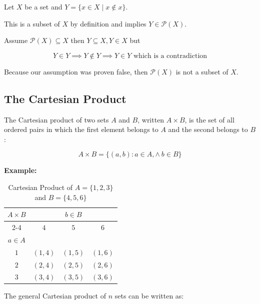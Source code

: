 Let \(X\) be a set and \(Y = \{x \in X \mid x \notin x\}\). 

This is a subset of \(X\) by definition and implies \(Y \in \mathcal{P}(X)\). 

Assume \(\mathcal{P}(X) \subseteq X\) then \(Y \subseteq X, Y \in X\) but 

\[
	Y \in Y \implies Y \notin Y \implies Y \in Y \text{ which is a contradiction}
\]

Because our assumption was proven false, then \(\mathcal{P}(X)\) is not a subset of \(X\).

\QED 

\subsection{The Cartesian Product}

The Cartesian product of two sets \(A\) and \(B\), written \(A \times B\), is the set of 
all ordered pairs in which the first element belongs to \(A\) and the second belongs to \(B\):

\[
	A \times B = \{ (a, b) : a \in A, \land\ b \in B\}
\]

\textbf{Example:}

\begin{table}[H]
	\centering
	\caption{Cartesian Product of \(A = \{1, 2, 3\}\) and \(B = \{4, 5, 6\}\)}
	\begin{tabular}{|c|c|c|c|}
		\hline
		\multirow{3}{*}{\(A \times B\)} & \multicolumn{3}{c|}{\(b \in B\)}                       \\
		\cline{2-4}
		                              & \(4\)                            & \(5\)      & \(6\)      \\
		\hline
		\(a \in A\)                     &                                &          &          \\
		\hline
		\(1\)                           & \((1, 4)\)                       & \((1, 5)\) & \((1, 6)\) \\
		\hline
		\(2\)                           & \((2, 4)\)                       & \((2, 5)\) & \((2, 6)\) \\
		\hline
		\(3\)                           & \((3, 4)\)                       & \((3, 5)\) & \((3, 6)\) \\
		\hline
	\end{tabular}
	\label{tab:cartesian_product}
\end{table}

The general Cartesian product of \(n\) sets can be written as:

